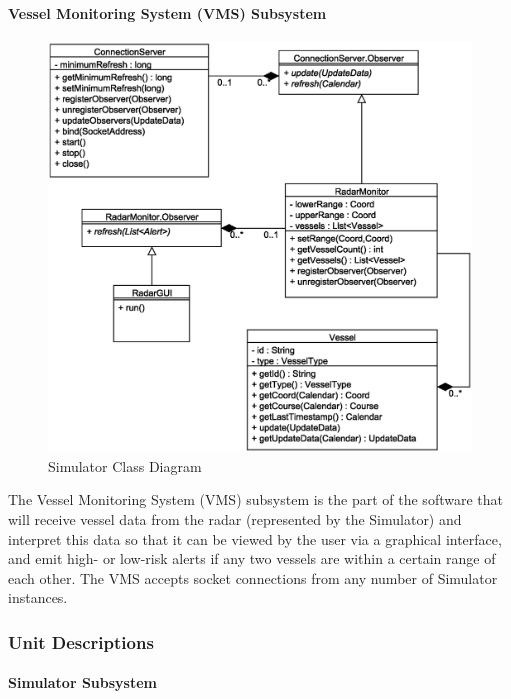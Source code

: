 \documentclass{article}
\begin{document}
\paragraph{Vessel Monitoring System (VMS) Subsystem}

\begin{figure}[h]
\caption{Simulator Class Diagram}
\includegraphics[width=\linewidth]{diagrams/vms-class-diagram.eps}
\end{figure}

The Vessel Monitoring System (VMS) subsystem is the part of the software that will receive vessel data from the radar (represented by the Simulator) and interpret this data so that it can be viewed by the user via a graphical interface, and emit high- or low-risk alerts if any two vessels are within a certain range of each other. The VMS accepts socket connections from any number of Simulator instances.

\subsubsection{Unit Descriptions}

\paragraph{Simulator Subsystem}
\end{document}

